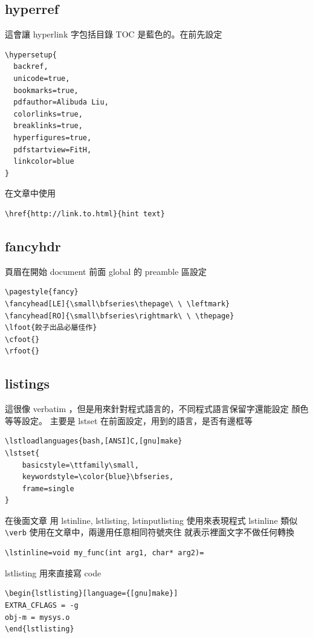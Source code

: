 \subsection{hyperref}
這會讓 hyperlink 字包括目錄 TOC 是藍色的。在\verb==前先設定
\begin{verbatim}
\hypersetup{
  backref,
  unicode=true,
  bookmarks=true,
  pdfauthor=Alibuda Liu,
  colorlinks=true,
  breaklinks=true,
  hyperfigures=true,
  pdfstartview=FitH,
  linkcolor=blue
}
\end{verbatim}
在文章中使用
\begin{verbatim}
\href{http://link.to.html}{hint text}
\end{verbatim}

\subsection{fancyhdr}
頁眉在開始 document 前面 global 的 preamble 區設定
\begin{verbatim}
\pagestyle{fancy}
\fancyhead[LE]{\small\bfseries\thepage\ \ \leftmark}
\fancyhead[RO]{\small\bfseries\rightmark\ \ \thepage}
\lfoot{餃子出品必屬佳作}
\cfoot{}
\rfoot{}
\end{verbatim}

\subsection{listings}
這很像 verbatim ，但是用來針對程式語言的，不同程式語言保留字還能設定
顏色等等設定。 主要是 lstset 在前面設定，用到的語言，是否有邊框等
\begin{verbatim}
\lstloadlanguages{bash,[ANSI]C,[gnu]make}
\lstset{
    basicstyle=\ttfamily\small,
    keywordstyle=\color{blue}\bfseries,
    frame=single
}
\end{verbatim}
在後面文章 用 lstinline, lstlisting, lstinputlisting 使用來表現程式
lstinline 類似 \verb=\verb= 使用在文章中，兩邊用任意相同符號夾住
就表示裡面文字不做任何轉換

\begin{verbatim}
\lstinline=void my_func(int arg1, char* arg2)=
\end{verbatim}

lstlisting 用來直接寫 code

\begin{verbatim}
\begin{lstlisting}[language={[gnu]make}]
EXTRA_CFLAGS = -g
obj-m = mysys.o
\end{lstlisting}
\end{verbatim}

